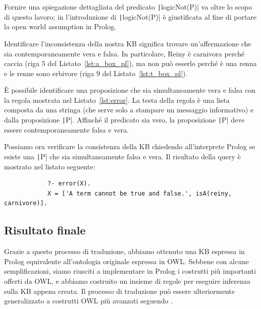 Fornire una spiegazione dettagliata del predicato \texttt|logicNot(P)| va oltre lo scopo di questo lavoro; in \cite{samuel2008translating} l'introduzione di \texttt|logicNot(P)| è giustificata al fine di portare la open world assumption in Prolog.

\begin{listingenv}[h]
	\caption{Classi disgiunte}
	\label{lst:disjoint}
\end{listingenv}

Identificare l'inconsistenza della nostra KB significa trovare un'affermazione che sia contemporaneamente vera e falsa. In particolare, Reiny è carnivora perché caccia (riga $5$ del Listato~\ref{lst:a_box_pl}), ma non può esserlo perché è una renna e le renne sono erbivore (riga $9$ del Listato~\ref{lst:t_box_pl}).

È possibile identificare una proposizione che sia simultaneamente vera e falsa con la regola mostrata nel Listato~\ref{lst:error}. La testa della regola è una lista composta da una stringa (che serve solo a stampare un messaggio informativo) e dalla proposizione \texttt|P|. Affinché il predicato sia vero, la proposizione \texttt|P| deve essere contemporaneamente falsa e vera.
\begin{listingenv}[h]
	\caption{Regola di errore}
	\label{lst:error}
\end{listingenv}

Possiamo ora verificare la consistenza della KB chiedendo all'interprete Prolog se esiste una \texttt|P| che sia simultaneamente falsa e vera. Il risultato della query è mostrato nel listato seguente:
\begin{center}
	\vspace{-.1cm}
	\begin{minipage}{.95\linewidth}
		\begin{verbatim}
			?- error(X).
			X = ['A term cannot be true and false.', isA(reiny, carnivore)].
		\end{verbatim}
	\end{minipage}
\end{center}

\subsection{Risultato finale}
Grazie a questo processo di traduzione, abbiamo ottenuto una KB espressa in Prolog equivalente all'ontologia originale espressa in OWL. Sebbene con alcune semplificazioni, siamo riusciti a implementare in Prolog i costrutti più importanti offerti da OWL, e abbiamo costruito un insieme di regole per eseguire inferenza sulla KB appena creata. Il processo di traduzione può essere ulteriormente generalizzato a costrutti OWL più avanzati seguendo \cite{samuel2008translating}.

